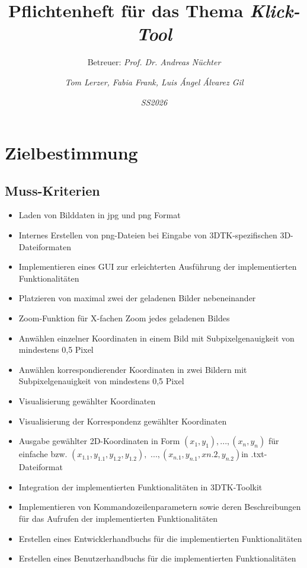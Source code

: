 \documentclass[a4paper,10pt]{scrartcl}
\title{Pflichtenheft für das Thema \glqq\textit{Klick-Tool}\grqq}
\subtitle{Betreuer: \textit{Prof. Dr. Andreas Nüchter}}
\author{\textit{Tom Lerzer, Fabia Frank, Luis Ángel Álvarez Gil}}
\date{\textit{SS2026}}
\begin{document}
\maketitle



\section{Zielbestimmung}

\subsection{Muss-Kriterien}

\begin{itemize}
    \item Laden von Bilddaten in jpg und png Format
    \item Internes Erstellen von png-Dateien bei Eingabe von 3DTK-spezifischen 3D-Dateiformaten
    \item Implementieren eines GUI zur erleichterten Ausführung der implementierten Funktionalitäten
    \item Platzieren von maximal zwei der geladenen Bilder nebeneinander
    \item Zoom-Funktion für X-fachen Zoom jedes geladenen Bildes
    \item Anwählen einzelner Koordinaten in einem Bild mit Subpixelgenauigkeit von mindestens 0,5 Pixel
    \item Anwählen korrespondierender Koordinaten in zwei Bildern mit Subpixelgenauigkeit von mindestens 0,5 Pixel
    \item Visualisierung gewählter Koordinaten
    \item Visualisierung der Korrespondenz gewählter Koordinaten
    \item Ausgabe gewählter 2D-Koordinaten in Form $(x_1, y_1), ..., (x_n, y_n)$ für einfache bzw. $(x_{1.1}, y_{1.1}, y_{1.2}, y_{1.2}),$ $ ..., (x_{n.1}, y_{n.1}, x{n.2}, y_{n.2})$in .txt-Dateiformat
    \item Integration der implementierten Funktionalitäten in 3DTK-Toolkit 
    \item Implementieren von Kommandozeilenparametern sowie deren Beschreibungen für das Aufrufen der implementierten Funktionalitäten
    \item Erstellen eines Entwicklerhandbuchs für die implementierten Funktionalitäten
    \item Erstellen eines Benutzerhandbuchs für die implementierten Funktionalitäten
\end{itemize}
\end{document}
